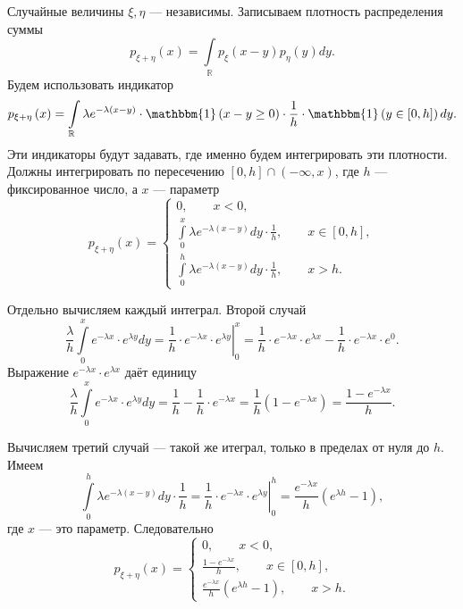 Случайные величины $ \xi, \eta $ --- независимы.
Записываем плотность распределения суммы
$$p_{ \xi + \eta } \left( x \right) =
\int \limits_{ \mathbb{R}} p_{ \xi } \left( x - y \right) p_{ \eta } \left( y \right) dy.$$
Будем использовать индикатор
$$p_{ \xi + \eta } \left( x \right) =
\int \limits_{ \mathbb{R}} \lambda e^{- \lambda \left( x-y \right) } \cdot
\mathbbm{1} \left( x-y \geq 0 \right) \cdot
\frac{1}{h} \cdot
\mathbbm{1} \left( y \in \left[ 0, h \right] \right) dy.$$
Эти индикаторы будут задавать, где именно будем интегрировать эти плотности.
Должны интегрировать по пересечению $ \left[ 0, h \right] \cap \left( - \infty, x \right)$, где $h$ --- фиксированное число, а $x$ --- параметр
$$p_{ \xi + \eta } \left( x \right) =
\begin{cases}
0, \qquad x < 0, \\
\int \limits_0^x \lambda e^{- \lambda \left( x-y \right) } dy \cdot \frac{1}{h}, \qquad x \in \left[ 0, h \right], \\
\int \limits_0^h \lambda e^{- \lambda \left( x-y \right) } dy \cdot \frac{1}{h}, \qquad x > h.
\end{cases}$$

Отдельно вычисляем каждый интеграл.
Второй случай
$$ \frac{ \lambda }{h} \int \limits_0^x e^{- \lambda x} \cdot e^{ \lambda y} dy =
\left. \frac{1}{h} \cdot e^{- \lambda x} \cdot e^{ \lambda y} \right|_0^x =
\frac{1}{h} \cdot e^{- \lambda x} \cdot e^{ \lambda x} - \frac{1}{h} \cdot e^{- \lambda x} \cdot e^0.$$
Выражение $e^{- \lambda x} \cdot e^{ \lambda x}$ даёт единицу
$$\frac{ \lambda }{h} \int \limits_0^x e^{- \lambda x} \cdot e^{ \lambda y} dy =
\frac{1}{h} - \frac{1}{h} \cdot e^{- \lambda x} =
\frac{1}{h} \left( 1 - e^{- \lambda x} \right) =
\frac{1-e^{- \lambda x}}{h}.$$

Вычисляем третий случай --- такой же итеграл, только в пределах от нуля до $h$.
Имеем
$$ \int \limits_0^h \lambda e^{- \lambda \left( x-y \right) } dy \cdot \frac{1}{h} =
\left. \frac{1}{h} \cdot e^{- \lambda x} \cdot e^{ \lambda y} \right|_0^h =
\frac{e^{- \lambda x}}{h} \left( e^{ \lambda h} - 1 \right),$$
где $x$ --- это параметр.
Следовательно
$$p_{ \xi + \eta } \left( x \right) =
\begin{cases}
0, \qquad x < 0, \\
\frac{1-e^{- \lambda x}}{h}, \qquad x \in \left[ 0, h \right], \\
\frac{e^{- \lambda x}}{h} \left( e^{ \lambda h} - 1 \right), \qquad x > h.
\end{cases}$$

